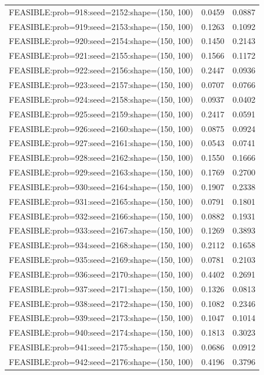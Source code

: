 \begin{longtable}{lcc}
FEASIBLE:prob=918:seed=2152:shape=(150, 100) &   0.0459 & 0.0887 \\
FEASIBLE:prob=919:seed=2153:shape=(150, 100) &   0.1263 & 0.1092 \\
FEASIBLE:prob=920:seed=2154:shape=(150, 100) &   0.1450 & 0.2143 \\
FEASIBLE:prob=921:seed=2155:shape=(150, 100) &   0.1566 & 0.1172 \\
FEASIBLE:prob=922:seed=2156:shape=(150, 100) &   0.2447 & 0.0936 \\
FEASIBLE:prob=923:seed=2157:shape=(150, 100) &   0.0707 & 0.0766 \\
FEASIBLE:prob=924:seed=2158:shape=(150, 100) &   0.0937 & 0.0402 \\
FEASIBLE:prob=925:seed=2159:shape=(150, 100) &   0.2417 & 0.0591 \\
FEASIBLE:prob=926:seed=2160:shape=(150, 100) &   0.0875 & 0.0924 \\
FEASIBLE:prob=927:seed=2161:shape=(150, 100) &   0.0543 & 0.0741 \\
FEASIBLE:prob=928:seed=2162:shape=(150, 100) &   0.1550 & 0.1666 \\
FEASIBLE:prob=929:seed=2163:shape=(150, 100) &   0.1769 & 0.2700 \\
FEASIBLE:prob=930:seed=2164:shape=(150, 100) &   0.1907 & 0.2338 \\
FEASIBLE:prob=931:seed=2165:shape=(150, 100) &   0.0791 & 0.1801 \\
FEASIBLE:prob=932:seed=2166:shape=(150, 100) &   0.0882 & 0.1931 \\
FEASIBLE:prob=933:seed=2167:shape=(150, 100) &   0.1269 & 0.3893 \\
FEASIBLE:prob=934:seed=2168:shape=(150, 100) &   0.2112 & 0.1658 \\
FEASIBLE:prob=935:seed=2169:shape=(150, 100) &   0.0781 & 0.2103 \\
FEASIBLE:prob=936:seed=2170:shape=(150, 100) &   0.4402 & 0.2691 \\
FEASIBLE:prob=937:seed=2171:shape=(150, 100) &   0.1326 & 0.0813 \\
FEASIBLE:prob=938:seed=2172:shape=(150, 100) &   0.1082 & 0.2346 \\
FEASIBLE:prob=939:seed=2173:shape=(150, 100) &   0.1047 & 0.1014 \\
FEASIBLE:prob=940:seed=2174:shape=(150, 100) &   0.1813 & 0.3023 \\
FEASIBLE:prob=941:seed=2175:shape=(150, 100) &   0.0686 & 0.0912 \\
FEASIBLE:prob=942:seed=2176:shape=(150, 100) &   0.4196 & 0.3796 \\

\end{longtable}
